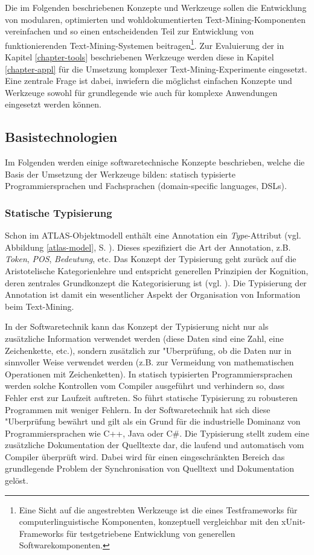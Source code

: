 \documentclass[abstracton, 12pt]{scrartcl}
\begin{document}
Die im Folgenden beschriebenen Konzepte und Werkzeuge sollen die Entwicklung von modularen, optimierten und wohldokumentierten Text-Mining-Komponenten vereinfachen und so einen entscheidenden Teil zur Entwicklung von funktionierenden Text-Mining-Systemen beitragen\footnote{Eine Sicht auf die angestrebten Werkzeuge ist die eines Testframeworks für computerlinguistische Komponenten, konzeptuell vergleichbar mit den xUnit-Frameworks für testgetriebene Entwicklung \citep{Beck2003} von generellen Softwarekomponenten.}. Zur Evaluierung der in Kapitel \ref{chapter-tools} beschriebenen Werkzeuge werden diese in Kapitel \ref{chapter-appl} für die Umsetzung komplexer Text-Mining-Experimente eingesetzt. Eine zentrale Frage ist dabei, inwiefern die möglichst einfachen Konzepte und Werkzeuge sowohl für grundlegende wie auch für komplexe Anwendungen eingesetzt werden können.

\subsection{Basistechnologien}

Im Folgenden werden einige softwaretechnische Konzepte beschrieben, welche die Basis der Umsetzung der Werkzeuge bilden: statisch typisierte Programmiersprachen und Fachsprachen (domain-specific languages, DSLs).

\subsubsection{Statische Typisierung} \label{statische-typisierung} 

Schon im ATLAS-Objektmodell enthält eine Annotation ein \emph{Type}-Attribut (vgl. Abbildung \ref{atlas-model}, S. \pageref{atlas-model}). Dieses spezifiziert die Art der Annotation, z.B. \emph{Token}, \emph{POS}, \emph{Bedeutung}, etc. Das Konzept der Typisierung geht zurück auf die Aristotelische Kategorienlehre und entspricht generellen Prinzipien der Kognition, deren zentrales Grundkonzept die Kategorisierung ist (vgl. \citealt{Hawkins2004,Harnad2005}). Die Typisierung der Annotation ist damit ein wesentlicher Aspekt der Organisation von Information beim Text-Mining.

In der Softwaretechnik kann das Konzept der Typisierung nicht nur als zusätzliche Information verwendet werden (diese Daten sind eine Zahl, eine Zeichenkette, etc.), sondern zusätzlich zur "Uberprüfung, ob die Daten nur in sinnvoller Weise verwendet werden (z.B. zur Vermeidung von mathematischen Operationen mit Zeichenketten). In statisch typisierten Programmiersprachen werden solche Kontrollen vom Compiler ausgeführt und verhindern so, dass Fehler erst zur Laufzeit auftreten. So führt statische Typisierung zu robusteren Programmen mit weniger Fehlern. In der Softwaretechnik hat sich diese "Uberprüfung bewährt und gilt als ein Grund für die industrielle Dominanz von Programmiersprachen wie C++, Java oder C\#. Die Typisierung stellt zudem eine zusätzliche Dokumentation der Quelltexte dar, die laufend und automatisch vom Compiler überprüft wird. Dabei wird für einen eingeschränkten Bereich das grundlegende Problem der Synchronisation von Quelltext und Dokumentation gelöst.
\end{document}
